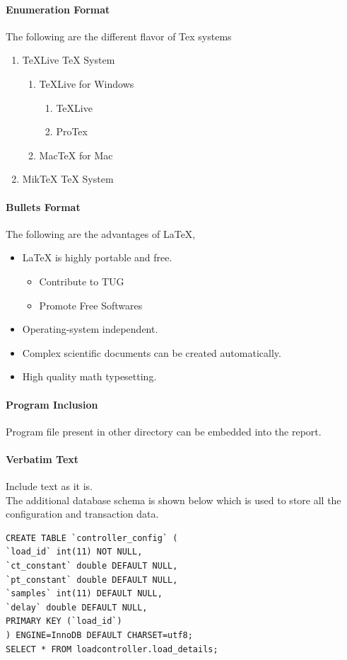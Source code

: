 \paragraph*{Enumeration Format}
The following are the different flavor of Tex systems
\begin{enumerate}
	\item TeXLive TeX System
		\begin{enumerate}
			\item TeXLive for Windows
			\begin{enumerate}
				\item TeXLive
				\item ProTex
			\end{enumerate}
			\item MacTeX for Mac
		\end{enumerate}
	\item MikTeX TeX System
\end{enumerate}

\paragraph*{Bullets Format}
The following are the advantages of LaTeX,
\begin{itemize}
	\item {\LaTeX} is highly portable and free.
	\begin{itemize}
		\item Contribute to TUG
		\item Promote Free Softwares
	\end{itemize}
	\item Operating-system independent.
	\item Complex scientific documents can be created
	automatically.
	\item High quality math typesetting.
\end{itemize}

\paragraph*{Program Inclusion} Program file present in other directory can be embedded into the report.


\paragraph*{Verbatim Text} Include text as it is.
\\
The additional database schema is shown below which is used to store all the configuration and transaction data.
\begin{verbatim}
CREATE TABLE `controller_config` (
`load_id` int(11) NOT NULL,
`ct_constant` double DEFAULT NULL,
`pt_constant` double DEFAULT NULL,
`samples` int(11) DEFAULT NULL,
`delay` double DEFAULT NULL,
PRIMARY KEY (`load_id`)
) ENGINE=InnoDB DEFAULT CHARSET=utf8;
SELECT * FROM loadcontroller.load_details;
\end{verbatim} 


